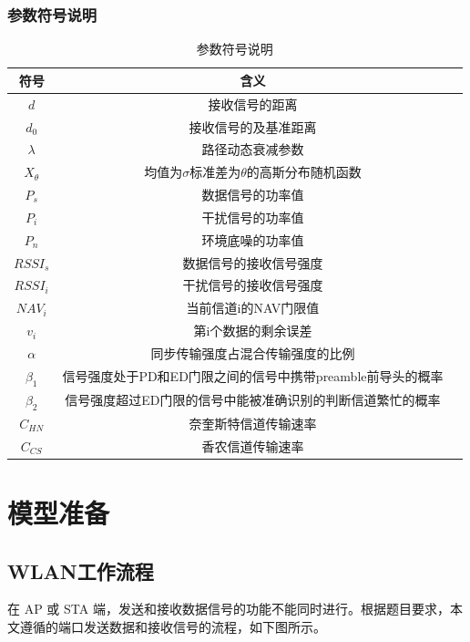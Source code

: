 \documentclass[bwprint]{gmcmthesis}
\begin{document}
\subsubsection{参数符号说明}
\begin{longtable}{ c c c }
	\caption{参数符号说明} \\ %
	\hline
	符号 & 含义   \\ %
	\hline
	
	$d$	& 接收信号的距离\\
	$d_0$ &	接收信号的及基准距离\\
	$ \lambda $	& 路径动态衰减参数\\
	$X_{\theta}$ &	均值为$\sigma$标准差为$\theta$的高斯分布随机函数\\
	$P_s$ &	数据信号的功率值\\
	$P_i$ &	干扰信号的功率值\\
	$P_n$ &	环境底噪的功率值\\
	$RSSI_s$ &	数据信号的接收信号强度\\
	$RSSI_i$ &	干扰信号的接收信号强度\\
	$NAV_i$ &	当前信道i的NAV门限值\\
	$v_i$ &	第i个数据的剩余误差\\
	$ \alpha $ &	同步传输强度占混合传输强度的比例\\
	$\beta_1$ &	信号强度处于PD和ED门限之间的信号中携带preamble前导头的概率\\
	$\beta_2$ &	信号强度超过ED门限的信号中能被准确识别的判断信道繁忙的概率\\
	$C_{HN}$ &	奈奎斯特信道传输速率\\
	$C_{CS}$ &	香农信道传输速率\\
	
	\hline
\end{longtable}

\section{模型准备}
\subsection{WLAN工作流程}

在 AP 或 STA 端，发送和接收数据信号的功能不能同时进行。根据题目要求，本文遵循的端口发送数据和接收信号的流程，如下图所示。
\end{document}
